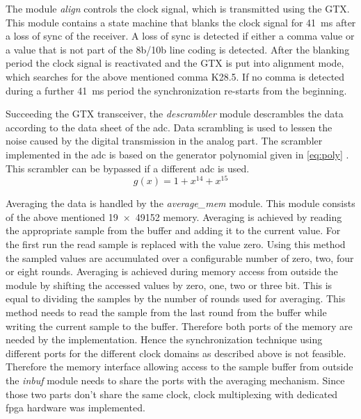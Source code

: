 \documentclass[12pt,a4paper,parskip=full,abstract=true,BCOR=12mm,twoside,open=right]{scrreprt}
\def\device#1{\mbox{\textit{#1}}}
\begin{document}
The module \device{align} controls the clock signal, which is transmitted using
the GTX. This module contains a state machine that blanks the clock signal
for \SI{41}{\milli\second} after a loss of sync of the receiver. A loss of sync is
detected if either a comma value or a value that is not part of the 8b/10b line coding
is detected. After the blanking period the clock signal is reactivated and
the GTX is put into alignment mode, which searches for the above mentioned comma
K28.5. If no comma is detected during a further \SI{41}{\milli\second} period the
synchronization re-starts from the beginning.

Succeeding the GTX transceiver, the \device{descrambler} module descrambles the data
according to the data sheet of the \gls{adc}\cite{ltc2274}. Data scrambling is
used to lessen the noise caused by the digital transmission in the analog part. The
scrambler implemented in the \gls{adc} is based on the generator polynomial given
in \cref{eq:poly} \cite{jesd205B.01}. This scrambler can be bypassed if a
different \gls{adc} is used.
\begin{equation}
    \label{eq:poly} g(x) = 1 + x^{14} + x^{15}
\end{equation}

Averaging the data is handled by the \device{average\_mem} module. This module
consists of the above mentioned \SI[product-units=brackets]{19 x 49152}{\bit} memory. Averaging is achieved
by reading the appropriate sample from the buffer and adding it to the current value.
For the first run the read sample is replaced with the value zero. Using this method
the sampled values are accumulated over a configurable number of zero, two,
four or eight rounds. Averaging is achieved during memory access from outside the module
by shifting the accessed values by zero, one, two or three bit. This is equal to dividing
the samples by the number of rounds used for averaging. This method needs to read
the sample from the last round from the buffer while writing the current sample
to the buffer. Therefore both ports of the memory are needed by the implementation.
Hence the synchronization technique using different ports for the different clock
domains as described above is not feasible. Therefore the memory interface allowing
access to the sample buffer from outside the \device{inbuf} module needs to share
the ports with the averaging mechanism. Since those two parts don't share the same
clock, clock multiplexing with dedicated \gls{fpga} hardware was implemented.
\end{document}
